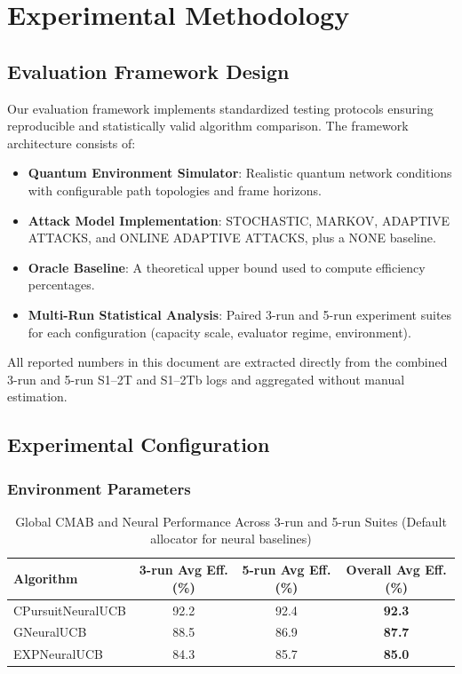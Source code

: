 \documentclass[12pt,a4paper]{article}
\begin{document}
\newpage
\section{Experimental Methodology}

\subsection{Evaluation Framework Design}

Our evaluation framework implements standardized testing protocols ensuring reproducible and statistically valid algorithm comparison. The framework architecture consists of:

\begin{itemize}
\item \textbf{Quantum Environment Simulator}: Realistic quantum network conditions with configurable path topologies and frame horizons.
\item \textbf{Attack Model Implementation}: STOCHASTIC, MARKOV, ADAPTIVE ATTACKS, and ONLINE ADAPTIVE ATTACKS, plus a NONE baseline.
\item \textbf{Oracle Baseline}: A theoretical upper bound used to compute efficiency percentages.
\item \textbf{Multi-Run Statistical Analysis}: Paired 3-run and 5-run experiment suites for each configuration (capacity scale, evaluator regime, environment).
\end{itemize}

All reported numbers in this document are extracted directly from the combined 3-run and 5-run S1–2T and S1–2Tb logs and aggregated without manual estimation.

\subsection{Experimental Configuration}

\subsubsection{Environment Parameters}

\begin{table}[h!]
\centering
\caption{Global CMAB and Neural Performance Across 3-run and 5-run Suites (Default allocator for neural baselines)}
\label{tab:global-performance}
\begin{tabular}{lccc}
\toprule
\textbf{Algorithm} & \textbf{3-run Avg Eff. (\%)} & \textbf{5-run Avg Eff. (\%)} & \textbf{Overall Avg Eff. (\%)} \\
\midrule
CPursuitNeuralUCB & 92.2 & 92.4 & \textbf{92.3} \\
GNeuralUCB        & 88.5 & 86.9 & \textbf{87.7} \\
EXPNeuralUCB      & 84.3 & 85.7 & \textbf{85.0} \\
\bottomrule
\end{tabular}
\end{table}
\end{document}
